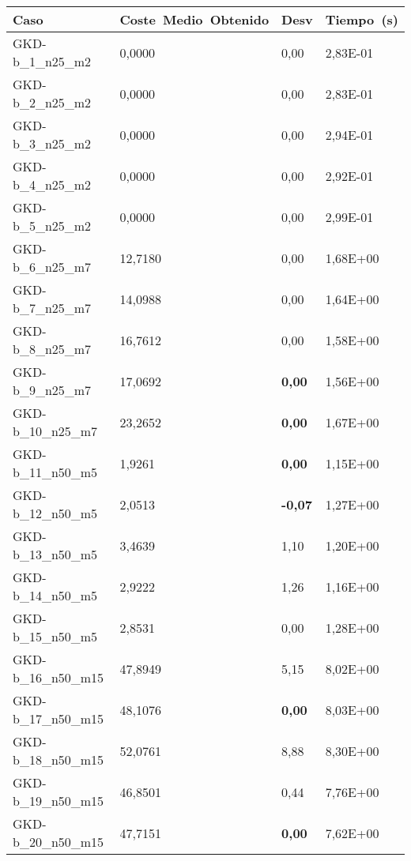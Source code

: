 \pagebreak

\begin{table}[!ht]%
    \centering    
    \begin{adjustbox}{height=12cm}
    \begin{tabular}{|l|l|l|l|}
    \hline
        Caso & Coste~Medio~Obtenido & Desv & Tiempo~(s) \\ \hline
		GKD-b\_1\_n25\_m2    & 0,0000   & 0,00           & 2,83E-01 \\ \hline
		GKD-b\_2\_n25\_m2    & 0,0000   & 0,00           & 2,83E-01 \\ \hline
		GKD-b\_3\_n25\_m2    & 0,0000   & 0,00           & 2,94E-01 \\ \hline
		GKD-b\_4\_n25\_m2    & 0,0000   & 0,00           & 2,92E-01 \\ \hline
		GKD-b\_5\_n25\_m2    & 0,0000   & 0,00           & 2,99E-01 \\ \hline
		GKD-b\_6\_n25\_m7    & 12,7180  & 0,00           & 1,68E+00 \\ \hline
		GKD-b\_7\_n25\_m7    & 14,0988  & 0,00           & 1,64E+00 \\ \hline
		GKD-b\_8\_n25\_m7    & 16,7612  & 0,00           & 1,58E+00 \\ \hline
		GKD-b\_9\_n25\_m7    & 17,0692  & \textbf{0,00}  & 1,56E+00 \\ \hline
		GKD-b\_10\_n25\_m7   & 23,2652  & \textbf{0,00}  & 1,67E+00 \\ \hline
		GKD-b\_11\_n50\_m5   & 1,9261   & \textbf{0,00}  & 1,15E+00 \\ \hline
		GKD-b\_12\_n50\_m5   & 2,0513   & \textbf{-0,07} & 1,27E+00 \\ \hline
		GKD-b\_13\_n50\_m5   & 3,4639   & 1,10           & 1,20E+00 \\ \hline
		GKD-b\_14\_n50\_m5   & 2,9222   & 1,26           & 1,16E+00 \\ \hline
		GKD-b\_15\_n50\_m5   & 2,8531   & 0,00           & 1,28E+00 \\ \hline
		GKD-b\_16\_n50\_m15  & 47,8949  & 5,15           & 8,02E+00 \\ \hline
		GKD-b\_17\_n50\_m15  & 48,1076  & \textbf{0,00}  & 8,03E+00 \\ \hline
		GKD-b\_18\_n50\_m15  & 52,0761  & 8,88           & 8,30E+00 \\ \hline
		GKD-b\_19\_n50\_m15  & 46,8501  & 0,44           & 7,76E+00 \\ \hline
		GKD-b\_20\_n50\_m15  & 47,7151  & \textbf{0,00}  & 7,62E+00 \\ \hline

\end{tabular}
\end{adjustbox}
\end{table}

